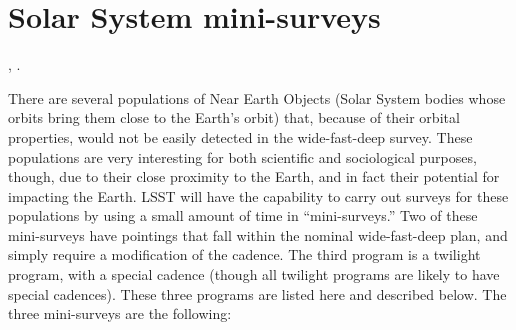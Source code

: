 %
%
%
%
%
%

\section{ Solar System mini-surveys }
\def\secname{solar_system_specials}\label{sec:\secname}

,
.



There are several populations of Near Earth Objects (Solar System
bodies whose orbits bring them close to the Earth's orbit) that,
because of their orbital properties, would not be easily
detected in the wide-fast-deep survey. These populations
are very interesting for both scientific and sociological
purposes, though, due to their close proximity to the Earth,
and in fact their potential for impacting the Earth.
LSST will have the capability to carry out surveys for
these populations by using a small amount of time
in ``mini-surveys.'' Two of these mini-surveys have
pointings that fall within the nominal wide-fast-deep
plan, and simply require a modification of the cadence.
The third program is a twilight program, with a special
cadence (though all twilight programs are likely to 
have special cadences). These three programs are listed
here and described below. The three mini-surveys are the following:


